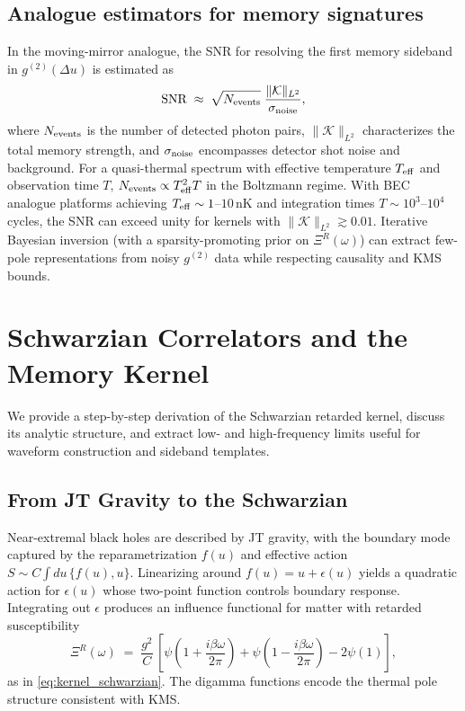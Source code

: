 \documentclass[11pt,a4paper]{article}
\theoremstyle{plain}
\theoremstyle{definition}
\theoremstyle{remark}
\begin{document}
\subsection{Analogue estimators for memory signatures}

\label{app:analog-estimator}
In the moving-mirror analogue, the SNR for resolving the first memory sideband in $g^{(2)}(\Delta u)$ is estimated as
\begin{equation}
\mathrm{SNR}\;\approx\;\sqrt{N_{\rm events}}\;\frac{\|\mathcal{K}\|_{L^2}}{\sigma_{\rm noise}},
\end{equation}
where $N_{\rm events}$ is the number of detected photon pairs, $\|\mathcal{K}\|_{L^2}$ characterizes the total memory strength, and $\sigma_{\rm noise}$ encompasses detector shot noise and background. For a quasi-thermal spectrum with effective temperature $T_{\rm eff}$ and observation time $T$, $N_{\rm events} \propto T_{\rm eff}^2 T$ in the Boltzmann regime. With BEC analogue platforms achieving $T_{\rm eff}\sim 1$--$10\,\mathrm{nK}$ and integration times $T\sim 10^3$--$10^4$ cycles, the SNR can exceed unity for kernels with $\|\mathcal{K}\|_{L^2}\gtrsim 0.01$. Iterative Bayesian inversion (with a sparsity-promoting prior on $\Xi^R(\omega)$) can extract few-pole representations from noisy $g^{(2)}$ data while respecting causality and KMS bounds.

\section{Schwarzian Correlators and the Memory Kernel}
\label{app:schwarzian_appendix} %
We provide a step-by-step derivation of the Schwarzian retarded kernel, discuss its analytic structure, and extract low- and high-frequency limits useful for waveform construction and sideband templates.

\subsection{From JT Gravity to the Schwarzian}
Near-extremal black holes are described by JT gravity, with the boundary mode captured by the reparametrization $f(u)$ and effective action $S\!\sim\!C\!\int du\,\{f(u),u\}$. Linearizing around $f(u)=u+\epsilon(u)$ yields a quadratic action for $\epsilon(u)$ whose two-point function controls boundary response. Integrating out $\epsilon$ produces an influence functional for matter with retarded susceptibility
\begin{equation}
\Xi^R(\omega)\;=\;\frac{g^2}{C}\,\left[\psi\!\left(1+\frac{i\beta\omega}{2\pi}\right)+\psi\!\left(1-\frac{i\beta\omega}{2\pi}\right)-2\psi(1)\right],
\end{equation}
as in \eqref{eq:kernel_schwarzian}. The digamma functions encode the thermal pole structure consistent with KMS.
\end{document}
